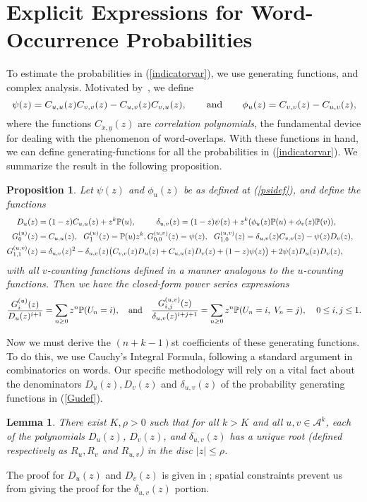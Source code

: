 \documentclass[proceedings]{aofa}
\newtheorem{lemma}{Lemma}
\newtheorem{proposition}{Proposition}
\newcommand{\Ak}{\mathcal{A}^{k}}
\newcommand{\pro}{\mathbb{P}}
\newcommand{\Pu}{\pro(u)}
\newcommand{\Pv}{\pro(v)}
\newcommand{\Cuu}{C_{u,u}}
\newcommand{\Cuv}{C_{u,v}}
\newcommand{\Cvu}{C_{v,u}}
\newcommand{\Cvv}{C_{v,v}}
\newcommand{\deltauv}{\delta_{u,v}}
\newcommand{\Dv}{D_{v}}
\newcommand{\Du}{D_{u}}
\newcommand{\phiu}{\phi_{u}}
\newcommand{\Ru}{R_{u}}
\newcommand{\Rv}{R_{v}}
\newcommand{\Ruv}{R_{u,v}}
\begin{document}
\section{Explicit Expressions for Word-Occurrence Probabilities}\label{sec:Cauchy}
To estimate the probabilities in (\ref{indicatorvar}), we use
generating functions, 
and complex analysis.
Motivated by~\cite{Bassino:2012}, 
we define
\begin{equation}\label{psidef}
\psi(z)=\Cuu(z)\Cvv(z)-\Cuv(z)\Cvu(z),\qquad\hbox{and}\qquad
\phiu(z)=\Cvv(z)-\Cuv(z),\end{equation}
where the functions $C_{x,y}(z)$ are \emph{correlation polynomials},
the fundamental device for dealing with the phenomenon of
word-overlaps. With these functions in hand, we can define
generating-functions 
for all the probabilities in (\ref{indicatorvar}). We summarize the result in the following proposition.
\begin{proposition}
Let $\psi(z)$ and $\phi_{u}(z)$ be as defined at (\ref{psidef}), and define the functions 
\begin{align}\label{deltadef}
D_{u}(z)&=(1-z)\Cuu(z)+ z^{k}\Pu,\;\;\qquad\delta_{u,v}(z)=(1-z)\psi(z) + z^{k}(\phiu(z)\Pu + \phiv(z)\Pv),\cr
G_{0}^{(u)}(z)&=C_{u,u}(z),\ \ G_{1}^{(u)}(z)=\Pu z^{k}, 
G_{0,0}^{(u,v)}(z)=\psi(z),\ \ 
G_{1,0}^{(u,v)}(z)=\delta_{u,v}(z)\Cvv(z)-\psi(z)\Dv(z),\cr
G_{1,1}^{(u,v)}(z)&=\delta_{u,v}(z)^{2} -\delta_{u,v}(z)\big(\Cvv(z)\Du(z)+\Cuu(z)\Dv(z)+(1-z)\psi(z)\big)+ 2\psi(z)\Du(z)\Dv(z),
\end{align}
with all $v$-counting functions defined in a manner analogous to the $u$-counting functions. Then we have the closed-form power series expressions
\begin{align}\label{Gudef}
\frac{G_{i}^{(u)}(z)}{D_{u}(z)^{i+1}}=\sum_{n \geq
  0}z^{n}\pro(U_{n}=i),\quad\hbox{and}\quad
\frac{G_{i,j}^{(u,v)}(z)}{\delta_{u,v}(z)^{i+j+1}}=\sum_{n \geq 0}z^{n}\pro(U_{n}=i,\;V_{n}=j),\;\;\;\; 0 \leq i,j \leq 1.
\end{align}
\end{proposition}


Now we must derive the $(n+k-1)$st coefficients of these generating
functions. To do this, we use Cauchy's Integral Formula, following a standard argument in combinatorics on words.  Our specific methodology will rely on a vital fact about the denominators $D_{u}(z),D_{v}(z)$ and $\deltauv(z)$ of the probability generating functions in (\ref{Gudef}).

\begin{lemma}\label{uniquerootlemma}
There exist $K,\rho>0$ such that for all $k > K$ and all $u, v \in \Ak$, 
each of the polynomials $D_{u}(z)$, $D_{v}(z)$, and $\delta_{u,v}(z)$ has a unique root (defined respectively as $\Ru,\Rv$ and $\Ruv$) in the disc $|z| \leq \rho$.
\end{lemma}
The proof for $D_{u}(z)$ and $D_{v}(z)$ is given in \cite{Jacquet:2005}; spatial constraints prevent us from giving the proof for the $\delta_{u,v}(z)$ portion.
\end{document}

